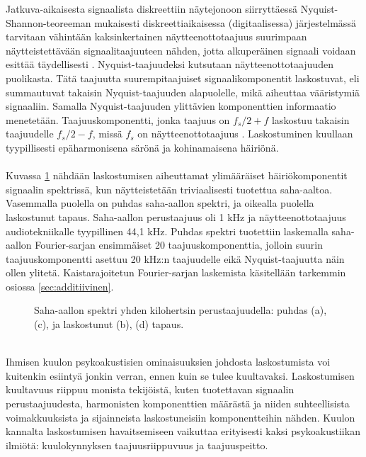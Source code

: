 \documentclass[finnish,12pt,a4paper,pdftex]{article} %
\begin{document}
Jatkuva-aikaisesta signaalista diskreettiin näytejonoon siirryttäessä Nyquist-Shannon-teoreeman mukaisesti diskreettiaikaisessa (digitaalisessa) järjestelmässä tarvitaan vähintään kaksinkertainen näytteenottotaajuus suurimpaan näytteistettävään signaalitaajuuteen nähden, jotta alkuperäinen signaali voidaan esittää täydellisesti \cite{Sound}. Nyquist-taajuudeksi kutsutaan näytteenottotaajuuden puolikasta. Tätä taajuutta suurempitaajuiset signaalikomponentit laskostuvat, eli summautuvat takaisin Nyquist-taajuuden alapuolelle, mikä aiheuttaa vääristymiä signaaliin. Samalla Nyquist-taajuuden ylittävien komponenttien informaatio menetetään. Taajuuskomponentti, jonka taajuus on $f_s/2+f$ laskostuu takaisin  taajuudelle $f_s/2-f$, missä $f_s$ on näytteenottotaajuus \cite{Pekonen2014}. Laskostuminen kuullaan tyypillisesti epäharmonisena särönä ja kohinamaisena häiriönä. \cite{Lehtonen2012} \\\\
Kuvassa \ref{fig:laskostuminen} nähdään laskostumisen aiheuttamat ylimääräiset häiriökomponentit signaalin spektrissä, kun näytteistetään triviaalisesti tuotettua saha-aaltoa. Vasemmalla puolella on puhdas saha-aallon spektri, ja oikealla puolella laskostunut tapaus. Saha-aallon perustaajuus oli 1 kHz ja näytteenottotaajuus audiotekniikalle tyypillinen 44,1 kHz. Puhdas spektri tuotettiin laskemalla saha-aallon Fourier-sarjan ensimmäiset 20 taajuuskomponenttia, jolloin suurin taajuuskomponentti asettuu 20 kHz:n taajuudelle eikä Nyquist-taajuutta näin ollen ylitetä. Kaistarajoitetun Fourier-sarjan laskemista käsitellään tarkemmin osiossa \ref{sec:additiivinen}.
\vspace{4mm}
\begin{figure}[b] 
	\begin{center} 
		\caption{Saha-aallon spektri yhden kilohertsin perustaajuudella: puhdas (a), (c), ja laskostunut (b), (d) tapaus.}
		\label{fig:laskostuminen}
	\end{center}
\end{figure} \\
Ihmisen kuulon psykoakustisien ominaisuuksien johdosta laskostumista voi kuitenkin esiintyä jonkin verran, ennen kuin se tulee kuultavaksi. Laskostumisen kuultavuus riippuu monista tekijöistä, kuten tuotettavan signaalin perustaajuudesta, harmonisten komponenttien määrästä ja niiden suhteellisista voimakkuuksista ja sijainneista laskostuneisiin komponentteihin nähden. Kuulon kannalta laskostumisen havaitsemiseen vaikuttaa erityisesti kaksi psykoakustiikan ilmiötä: kuulokynnyksen taajuusriippuvuus ja taajuuspeitto. \cite{Pekonen2014, Lehtonen2012} \\\\
\end{document}

